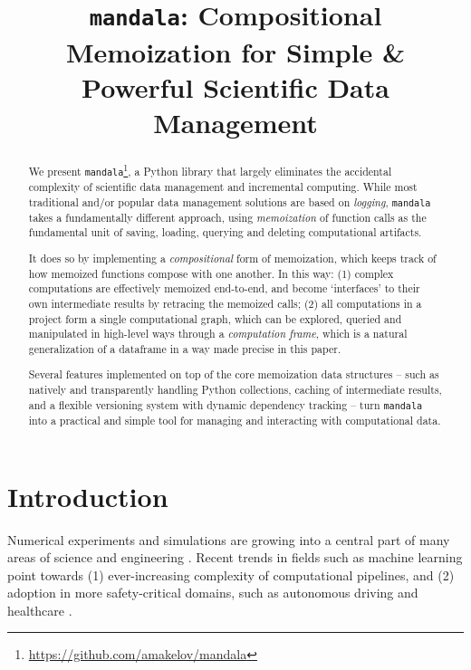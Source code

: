 \documentclass{article} %
\title{\texttt{mandala}: Compositional Memoization for Simple \&
Powerful Scientific Data Management}
\begin{document}
\maketitle


\begin{abstract}
  We present
  \texttt{mandala}\footnote{\url{https://github.com/amakelov/mandala}}, a Python
  library that largely eliminates the accidental complexity of scientific data
  management and incremental computing. While most traditional and/or
  popular data management solutions are based on \emph{logging},
  \texttt{mandala} takes a fundamentally different approach, using
  \emph{memoization} of function calls as the fundamental unit of saving,
  loading, querying and deleting computational artifacts. 
  
  It does so by implementing a \emph{compositional} form of memoization, which keeps
  track of how memoized functions compose with one another. In this way: (1)
  complex computations are effectively memoized end-to-end, and become
  `interfaces' to their own intermediate results by retracing the memoized
  calls; (2) all computations in a project form a single computational graph,
  which can be explored, queried and manipulated in high-level ways through a
  \emph{computation frame}, which is a natural generalization of a dataframe in
  a way made precise in this paper. 

  Several features implemented on top of the core memoization data structures --
  such as natively and transparently handling Python collections, caching of
  intermediate results, and a flexible versioning system with dynamic dependency
  tracking -- turn \texttt{mandala} into a practical and simple tool for
  managing and interacting with computational data.
\end{abstract}

\section{Introduction}
\label{section:intro}

Numerical experiments and simulations are growing into a central part of many
areas of science and engineering \citep{hey2009fourth}. Recent trends in fields
such as machine learning point towards (1) ever-increasing complexity of
computational pipelines, and (2) adoption in more safety-critical domains, such
as autonomous driving \citep{bojarski2016end} and healthcare
\citep{ravi2016deep,abramson2024accurate}.
\end{document}
